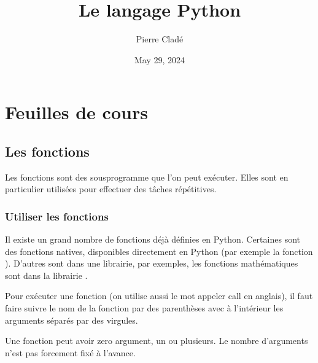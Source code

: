 \documentclass[letterpaper,10pt,english]{sphinxhowto}
\title{Le langage Python}
\date{May 29, 2024}
\author{Pierre Cladé}
\begin{document}
\pagestyle{empty}
\sphinxmaketitle
\pagestyle{plain}

\pagestyle{normal}
\label{\detokenize{index::doc}}



\section{Feuilles de cours}
\label{\detokenize{feuilles_de_cours:feuilles-de-cours}}\label{\detokenize{feuilles_de_cours::doc}}

\subsection{Les fonctions}
\label{\detokenize{cours1_fonctions_cours:les-fonctions}}\label{\detokenize{cours1_fonctions_cours::doc}}
\sphinxAtStartPar
Les fonctions sont des sous\sphinxhyphen{}programme que l’on peut exécuter. Elles sont en particulier utilisées pour effectuer des tâches répétitives.


\subsubsection{Utiliser les fonctions}
\label{\detokenize{cours1_fonctions_cours:utiliser-les-fonctions}}
\sphinxAtStartPar
Il existe un grand nombre de fonctions déjà définies en Python. Certaines sont des fonctions natives, disponibles directement en Python (par exemple la fonction ). D’autres sont dans une librairie, par exemples, les fonctions mathématiques sont dans la librairie .

\sphinxAtStartPar
Pour exécuter une fonction (on utilise aussi le mot appeler \sphinxhyphen{} call en anglais), il faut faire suivre le nom de la fonction par des parenthèses avec à l’intérieur les arguments séparés par des virgules.

\sphinxAtStartPar
Une fonction peut avoir zero argument, un ou plusieurs. Le nombre d’arguments n’est pas forcement fixé à l’avance.

\begin{sphinxVerbatim}[commandchars=\\\{\}]
 

    
 

  
\end{sphinxVerbatim}
\end{document}
